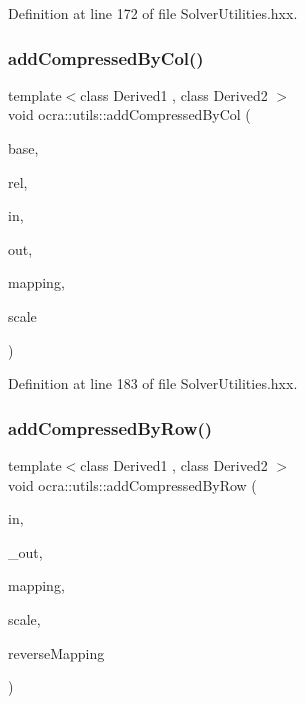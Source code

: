 Definition at line 172 of file Solver\+Utilities.\+hxx.

\hypertarget{namespaceocra_1_1utils_a8b6a78df5f205a61d8b4d29a2a82c864}{}\label{namespaceocra_1_1utils_a8b6a78df5f205a61d8b4d29a2a82c864} 
\subsubsection{\texorpdfstring{add\+Compressed\+By\+Col()}{addCompressedByCol()}\hspace{0.1cm}{\footnotesize\ttfamily [2/2]}}
{\footnotesize\ttfamily template$<$class Derived1 , class Derived2 $>$ \\
void ocra\+::utils\+::add\+Compressed\+By\+Col (\begin{DoxyParamCaption}\item[{const \hyperlink{classocra_1_1Variable}{Variable} \&}]{base,  }\item[{const \hyperlink{classocra_1_1Variable}{Variable} \&}]{rel,  }\item[{const Matrix\+Base$<$ Derived1 $>$ \&}]{in,  }\item[{Matrix\+Base$<$ Derived2 $>$ const \&}]{out,  }\item[{std\+::vector$<$ int $>$ \&}]{mapping,  }\item[{double}]{scale }\end{DoxyParamCaption})\hspace{0.3cm}{\ttfamily [inline]}}



Definition at line 183 of file Solver\+Utilities.\+hxx.

\hypertarget{namespaceocra_1_1utils_a8256ba2ed6ce4d6066c03631e64e27f9}{}\label{namespaceocra_1_1utils_a8256ba2ed6ce4d6066c03631e64e27f9} 
\subsubsection{\texorpdfstring{add\+Compressed\+By\+Row()}{addCompressedByRow()}\hspace{0.1cm}{\footnotesize\ttfamily [1/2]}}
{\footnotesize\ttfamily template$<$class Derived1 , class Derived2 $>$ \\
void ocra\+::utils\+::add\+Compressed\+By\+Row (\begin{DoxyParamCaption}\item[{const Matrix\+Base$<$ Derived1 $>$ \&}]{in,  }\item[{Matrix\+Base$<$ Derived2 $>$ const \&}]{\+\_\+out,  }\item[{const std\+::vector$<$ int $>$ \&}]{mapping,  }\item[{double}]{scale,  }\item[{bool}]{reverse\+Mapping }\end{DoxyParamCaption})\hspace{0.3cm}{\ttfamily [inline]}}



